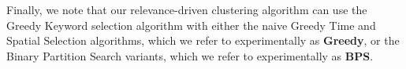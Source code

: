 

Finally, we note that our relevance-driven clustering algorithm can use the Greedy Keyword selection algorithm with either the naive Greedy Time and Spatial Selection algorithms, which we refer to experimentally as {\bf Greedy}, or the Binary Partition Search variants, which we refer to experimentally as {\bf BPS}.  






